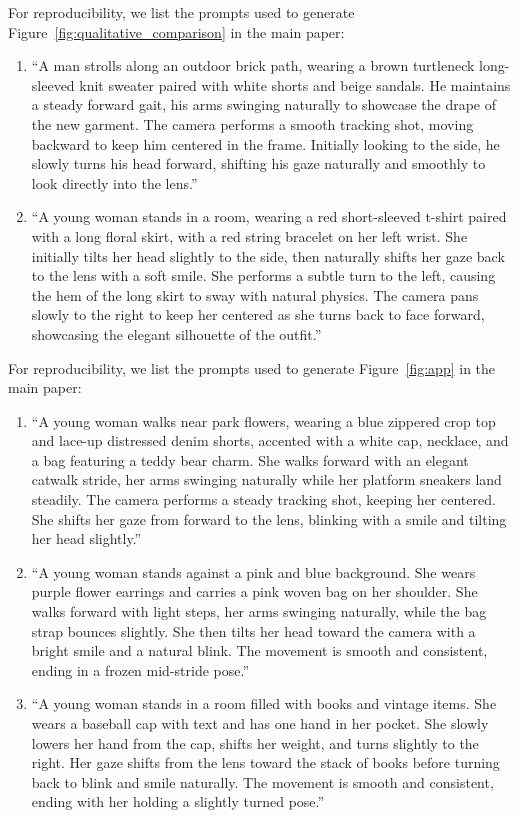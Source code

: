 For reproducibility, we list the prompts used to generate Figure~\ref{fig:qualitative_comparison} in the main paper:
\begin{enumerate}
\item ``A man strolls along an outdoor brick path, wearing a brown turtleneck long-sleeved knit sweater paired with white shorts and beige sandals. He maintains a steady forward gait, his arms swinging naturally to showcase the drape of the new garment. The camera performs a smooth tracking shot, moving backward to keep him centered in the frame. Initially looking to the side, he slowly turns his head forward, shifting his gaze naturally and smoothly to look directly into the lens.''
% 
\item ``A young woman stands in a room, wearing a red short-sleeved t-shirt paired with a long floral skirt, with a red string bracelet on her left wrist. She initially tilts her head slightly to the side, then naturally shifts her gaze back to the lens with a soft smile. She performs a subtle turn to the left, causing the hem of the long skirt to sway with natural physics. The camera pans slowly to the right to keep her centered as she turns back to face forward, showcasing the elegant silhouette of the outfit.''
\end{enumerate}



For reproducibility, we list the prompts used to generate Figure~\ref{fig:app} in the main paper:
\begin{enumerate}
\item ``A young woman walks near park flowers, wearing a blue zippered crop top and lace-up distressed denim shorts, accented with a white cap, necklace, and a bag featuring a teddy bear charm. She walks forward with an elegant catwalk stride, her arms swinging naturally while her platform sneakers land steadily. The camera performs a steady tracking shot, keeping her centered. She shifts her gaze from forward to the lens, blinking with a smile and tilting her head slightly.''
% 
\item ``A young woman stands against a pink and blue background. She wears purple flower earrings and carries a pink woven bag on her shoulder. She walks forward with light steps, her arms swinging naturally, while the bag strap bounces slightly. She then tilts her head toward the camera with a bright smile and a natural blink. The movement is smooth and consistent, ending in a frozen mid-stride pose.''
% 
\item ``A young woman stands in a room filled with books and vintage items. She wears a baseball cap with text and has one hand in her pocket. She slowly lowers her hand from the cap, shifts her weight, and turns slightly to the right. Her gaze shifts from the lens toward the stack of books before turning back to blink and smile naturally. The movement is smooth and consistent, ending with her holding a slightly turned pose.''
\end{enumerate}



